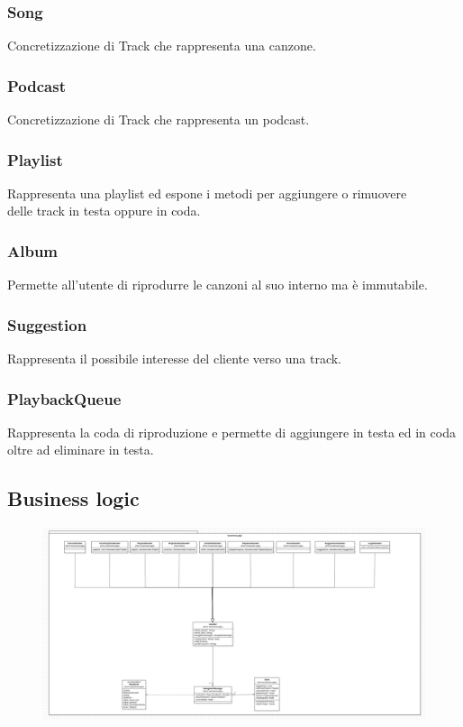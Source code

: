 \documentclass{article}
\begin{document}
  \subsubsection{Song}
  Concretizzazione di Track che rappresenta una canzone.
  \subsubsection{Podcast}
  Concretizzazione di Track che rappresenta un podcast.
  \subsubsection{Playlist}
  Rappresenta una playlist ed espone i metodi per aggiungere o rimuovere\\ delle track in testa oppure in coda.
  \subsubsection{Album}
  Permette all'utente di riprodurre le canzoni al suo interno ma è immutabile.
  \subsubsection{Suggestion}
  Rappresenta il possibile interesse del cliente verso una track.
  \subsubsection{PlaybackQueue}
  Rappresenta la coda di riproduzione e permette di aggiungere in testa ed in coda oltre ad eliminare in testa.

  \subsection{Business logic}

  \begin{figure}[H]
    \includegraphics[scale=0.28]{logic01}
  \end{figure}
\end{document}
